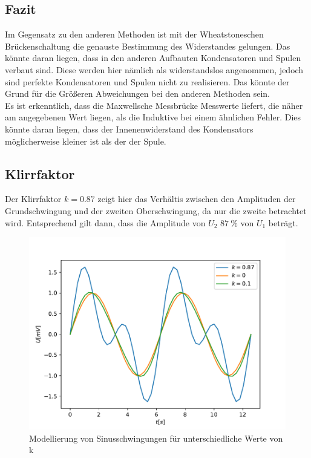     \subsection{Fazit}
    Im Gegensatz zu den anderen Methoden ist mit der Wheatstoneschen Brückenschaltung die genauste Bestimmung des Widerstandes gelungen.
    Das könnte daran liegen, dass in den anderen Aufbauten Kondensatoren und Spulen verbaut sind. 
    Diese werden hier nämlich als widerstandslos angenommen, jedoch sind perfekte Kondensatoren und Spulen nicht zu realisieren.
    Das könnte der Grund für die Größeren Abweichungen bei den anderen Methoden sein.\\
    Es ist erkenntlich, dass die Maxwellsche Messbrücke Messwerte liefert, die näher am angegebenen
    Wert liegen, als die Induktive bei einem ähnlichen Fehler. 
    Dies könnte daran liegen, dass der Innenenwiderstand des Kondensators möglicherweise kleiner ist als der der Spule.

    \subsection{Klirrfaktor}
    Der Klirrfaktor $k=0.87$ zeigt hier das Verhältis zwischen den Amplituden der Grundschwingung und der zweiten Oberschwingung,
    da nur die zweite betrachtet wird.
    Entsprechend gilt dann, dass die Amplitude von $U_2$ $\qty{87}{\percent}$ von $U_1$ beträgt.

    \begin{figure}
        \centering
        \includegraphics{./Klirr_Model.pdf}
        \caption{Modellierung von Sinusschwingungen für unterschiedliche Werte von k}
        \label{fig:klirr_mod}
    \end{figure}

